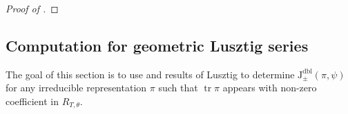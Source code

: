 \documentclass[12pt, reqno]{amsart}
\theoremstyle{definition}
\theoremstyle{definition}
\theoremstyle{definition}
\newcommand{\cComplex}{\mathbb{C}}
\newcommand{\multiplicativegroup}[1]{#1^{\times}}
\newcommand{\fieldCharacter}{\psi}
\newcommand{\trace}{\operatorname{tr}}
\newcommand{\GL}{\mathrm{GL}}
\newcommand{\finiteField}{\mathbb{F}}
\newcommand{\finiteFieldExtension}[1]{\finiteField_{#1}}
\newcommand{\dblJacobiSumScalar}[2]{\mathrm{J}_{\pm}^{\mathrm{dbl}}\left(#1, #2\right)}
\newcommand{\calvin}[1]{\textcolor{orange}{\sffamily ((CALVIN: #1))}}
\begin{document}
\begin{proof}[Proof of ]
\begin{comment}
Write $T \cong \prod_{j=1}^r \multiplicativegroup{\finiteFieldExtension{k_j}} \times \prod_{i=1}^s (\finiteFieldExtension{2m_i}^1)^2$ with $k_i$'s even and $m_i$'s odd \calvin{this is what I need to check... what tori you can get here} and under the above isomorphism $\theta = \alpha_1 \times \dots \times \alpha_r \times \theta_1 \times \dots \times \theta_s \times \epsilon$, where  $\left[\epsilon \colon \left\{\pm 1\right\} \to \multiplicativegroup{\cComplex},\right]$ $\alpha_j \colon \multiplicativegroup{\finiteFieldExtension{k_j}} \to \multiplicativegroup{\cComplex}$ and $\theta_i \colon \finiteFieldExtension{2m_i}^1 \to \multiplicativegroup{\cComplex}$. Then the Frobenius conjugacy class of the Weyl group corresponding to $T$ is represented by having even cycles of lengths $k_1,k_2 \hdots k_r$ and odd cycles of lengths $m_1,m_1,m_2,m_2, \hdots, m_s,m_s$. The map $\Phi$ sends this conjugacy class to the conjugacy class with even cycles $k_1,k_1,k_2,k_2 \hdots k_r,k_r$ and odd cycles $m_1,m_1,m_1,m_1,m_2,m_2,m_2,m_2, \hdots, m_s,m_s,m_s,m_s$. Let $\tilde{T}$ be the torus in $\GL$ corresponding to the conjugacy class with all even cycles of lengths $k_1,k_1,k_2,k_2 \hdots k_r,k_r$ and $2m_1,2m_1,2m_2,2m_2, \hdots, 2m_s,2m_s$. Then $\Phi(s)$ is in this torus \calvin{write out what that means} giving a character $\tilde{\theta}$ on it and 
\[
    \sum_{t \in \tilde{T}} \tilde{\theta}(t) \chi(det(t-1)) = g_T(\theta,\psi).
\]
Since the sum above is a Gauss sum for $\GL$ it is equal to the Gauss sum attatched to the semisimple element $\Phi(s)$.
\end{comment}
\end{proof}

\subsection{Computation for geometric Lusztig series}

The goal of this section is to use  and results of Lusztig to determine $\dblJacobiSumScalar{\pi}{\fieldCharacter}$ for any irreducible representation $\pi$ such that $\trace \pi$ appears with non-zero coefficient in $R_{T,\theta}$.
\end{document}
